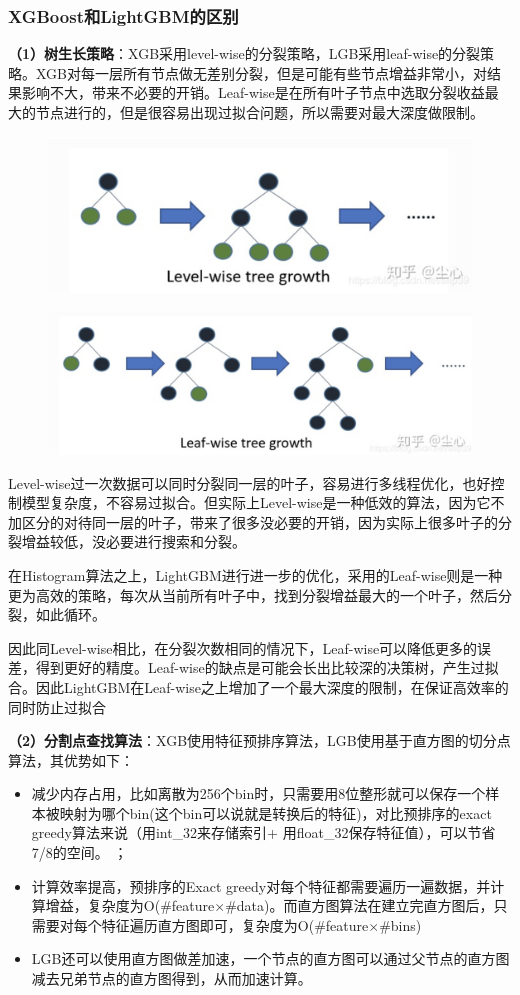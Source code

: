 \documentclass[12pt]{article}
\begin{document}
\subsubsection{XGBoost和LightGBM的区别}
\textbf{（1）树生长策略}：XGB采用level-wise的分裂策略，LGB采用leaf-wise的分裂策略。XGB对每一层所有节点做无差别分裂，但是可能有些节点增益非常小，对结果影响不大，带来不必要的开销。Leaf-wise是在所有叶子节点中选取分裂收益最大的节点进行的，但是很容易出现过拟合问题，所以需要对最大深度做限制。
\begin{figure}[H]
    \centering
    \includegraphics[width=.6\textwidth]{fig/LightGBM_Node_Split_Level_Wise.png}
\end{figure}
\begin{figure}[H]
    \centering
    \includegraphics[width=.6\textwidth]{fig/LightGBM_Node_Split_Leaf_Wise.png}
\end{figure}

Level-wise过一次数据可以同时分裂同一层的叶子，容易进行多线程优化，也好控制模型复杂度，不容易过拟合。但实际上Level-wise是一种低效的算法，因为它不加区分的对待同一层的叶子，带来了很多没必要的开销，因为实际上很多叶子的分裂增益较低，没必要进行搜索和分裂。

在Histogram算法之上，LightGBM进行进一步的优化，采用的Leaf-wise则是一种更为高效的策略，每次从当前所有叶子中，找到分裂增益最大的一个叶子，然后分裂，如此循环。

因此同Level-wise相比，在分裂次数相同的情况下，Leaf-wise可以降低更多的误差，得到更好的精度。Leaf-wise的缺点是可能会长出比较深的决策树，产生过拟合。因此LightGBM在Leaf-wise之上增加了一个最大深度的限制，在保证高效率的同时防止过拟合


\textbf{（2）分割点查找算法}：XGB使用特征预排序算法，LGB使用基于直方图的切分点算法，其优势如下：
\begin{itemize}
\setlength{\itemsep}{0pt}
\setlength{\parsep}{0pt}
\setlength{\parskip}{0pt}
    \item 减少内存占用，比如离散为256个bin时，只需要用8位整形就可以保存一个样本被映射为哪个bin(这个bin可以说就是转换后的特征)，对比预排序的exact greedy算法来说（用int\_32来存储索引+ 用float\_32保存特征值），可以节省7/8的空间。
；
    \item 计算效率提高，预排序的Exact greedy对每个特征都需要遍历一遍数据，并计算增益，复杂度为O(\#feature$\times$\#data)。而直方图算法在建立完直方图后，只需要对每个特征遍历直方图即可，复杂度为O(\#feature$\times$\#bins)
    \item LGB还可以使用直方图做差加速，一个节点的直方图可以通过父节点的直方图减去兄弟节点的直方图得到，从而加速计算。
\end{itemize}
\end{document}
